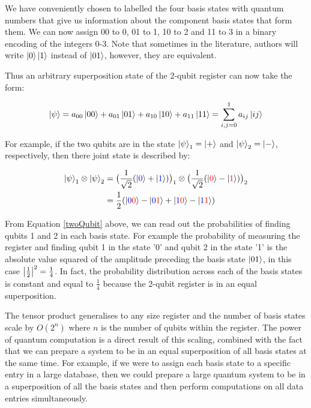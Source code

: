 We have conveniently chosen to labelled the four basis states with quantum numbers that give us information about the component basis states that form them. We can now assign 00 to 0, 01 to 1, 10 to 2 and 11 to 3 in a binary encoding of the integers 0-3. Note that sometimes in the literature, authors will write $\left\vert{0}\right\rangle\left\vert{1}\right\rangle$ instead of $\left\vert{01}\right\rangle$, however, they are equivalent.

Thus an arbitrary superposition state of the 2-qubit register can now take the form:

\begin{equation}
    \left\vert{\psi}\right\rangle=a_{00}\left\vert{00}\right\rangle+a_{01}\left\vert{01}\right\rangle+a_{10}\left\vert{10}\right\rangle+a_{11}\left\vert{11}\right\rangle = \sum_{i,j=0}^{1}a_{ij}\left\vert{ij}\right\rangle
\end{equation}

For example, if the two qubits are in the state $\left\vert{\psi}\right\rangle_1 = \left\vert{+}\right\rangle$ and $\left\vert{\psi}\right\rangle_2 = \left\vert{-}\right\rangle$, respectively, then there joint state is described by:

\begin{equation}\label{twoQubit}
    \begin{split}
        \left\vert{\psi}\right\rangle_1 \otimes \left\vert{\psi}\right\rangle_2 &= \big(\frac{1}{\sqrt{2}}(\left\vert{\textcolor{blue}{0}}\right\rangle+\left\vert{\textcolor{blue}{1}}\right\rangle)\big)_1 \otimes \big(\frac{1}{\sqrt{2}}(\left\vert{\textcolor{red}{0}}\right\rangle-\left\vert{\textcolor{red}{1}}\right\rangle)\big)_2\\
        &= \frac{1}{2}(\left\vert{\textcolor{blue}{0}\textcolor{red}{0}}\right\rangle-\left\vert{\textcolor{blue}{0}\textcolor{red}{1}}\right\rangle+\left\vert{\textcolor{blue}{1}\textcolor{red}{0}}\right\rangle-\left\vert{\textcolor{blue}{1}\textcolor{red}{1}}\right\rangle)
    \end{split}
\end{equation}

From Equation \ref{twoQubit} above, we can read out the probabilities of finding qubits 1 and 2 in each basis state. For example the probability of measuring the register and finding qubit 1 in the state '0' and qubit 2 in the state '1' is the absolute value squared of the amplitude preceding the basis state $\left\vert{01}\right\rangle$, in this case $\abs{\frac{1}{2}}^2 = \frac{1}{4}$. In fact, the probability distribution across each of the basis states is constant and equal to $\frac{1}{4}$ because the 2-qubit register is in an equal superposition.

The tensor product generalises to any size register and the number of basis states scale by $O(2^n)$ where $n$ is the number of qubits within the register. The power of quantum computation is a direct result of this scaling, combined with the fact that we can prepare a system to be in an equal superposition of all basis states at the same time. For example, if we were to assign each basis state to a specific entry in a large database, then we could prepare a large quantum system to be in a superposition of all the basis states and then perform computations on all data entries simultaneously.

